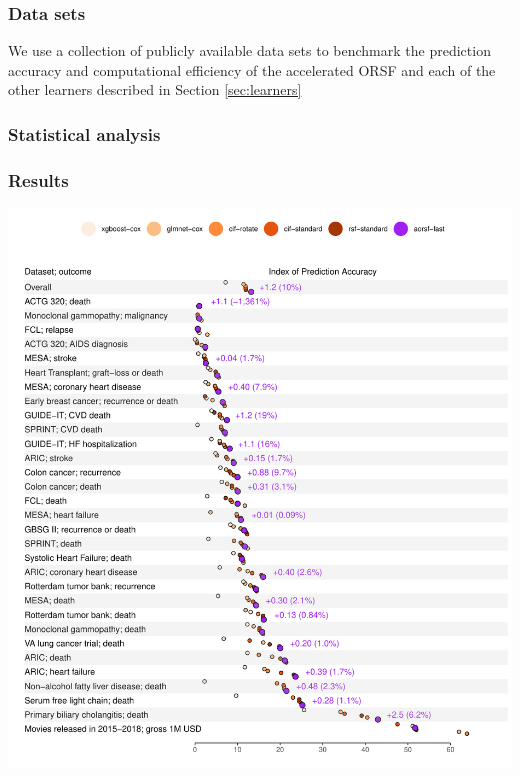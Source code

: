 \documentclass[twoside,11pt]{article}\usepackage[]{graphicx}\usepackage[]{xcolor}
\makeatletter
\def\maxwidth{ %
  \ifdim\Gin@nat@width>\linewidth
    \linewidth
  \else
    \Gin@nat@width
  \fi
}
\newenvironment{knitrout}{}{} %
\newcommand{\secref}[1]{Section \ref{#1}}
\makeatother
\begin{document}
\subsubsection{Data sets}

We use a collection of publicly available data sets to benchmark the prediction accuracy and computational efficiency of the accelerated ORSF and each of the other learners described in \secref{sec:learners}

\subsubsection{Statistical analysis}

\subsubsection{Results}

\begin{knitrout}
\color{fgcolor}
\includegraphics[width=\maxwidth]{figure/unnamed-chunk-2-1} 
\end{knitrout}
\end{document}
